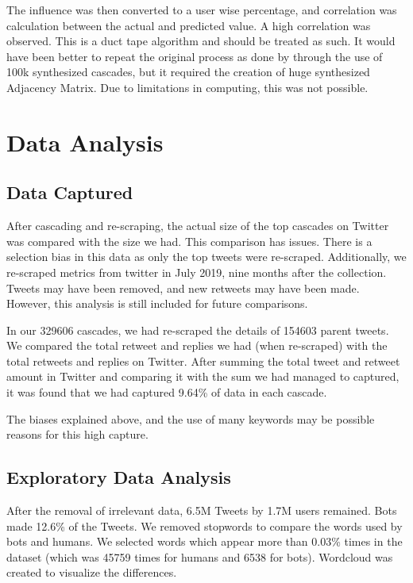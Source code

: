 \documentclass[letterpaper]{article}
\begin{document}
 The influence was then converted to a user wise percentage, and correlation was calculation between the actual and predicted value. A high correlation was observed. 
 This is a duct tape algorithm and should be treated as such. It would have been better to repeat the original process as done by \cite{rizoiu2018debatenight} through the use of 
 100k synthesized cascades, but it required the creation of huge synthesized Adjacency Matrix. Due to limitations in computing, this was not possible.

 \section{Data Analysis}
\label{sec:analysis}
\subsection{Data Captured}
After cascading and re-scraping, the actual size of the top cascades on Twitter was compared with the size we had. This comparison has issues. There is a selection bias in this data as only the top tweets were re-scraped. 
Additionally, we re-scraped metrics from twitter in July 2019, nine months after the collection. Tweets may have been removed, and new retweets may have been made.
However, this analysis is still included for future comparisons. \par

In our 329606 cascades, we had re-scraped the details of 154603 parent
tweets. We compared the total retweet and replies we had (when re-scraped) with the total retweets and replies on Twitter. After summing the total tweet and retweet amount in Twitter 
and comparing it with the sum we had managed to captured, it was found that we had captured 9.64\% of data in each cascade. \par

The biases explained
above, and the use of many keywords may be possible reasons for this high capture.

\subsection{Exploratory Data Analysis}
After the removal of irrelevant data, 6.5M Tweets by 1.7M users remained. Bots made 12.6\% of the Tweets. We removed stopwords to compare the words used by bots and humans. 
We selected words which appear more than 0.03\% times in the dataset (which was 45759 times for humans and 6538 for bots). Wordcloud was created to visualize 
the differences.
\end{document}
